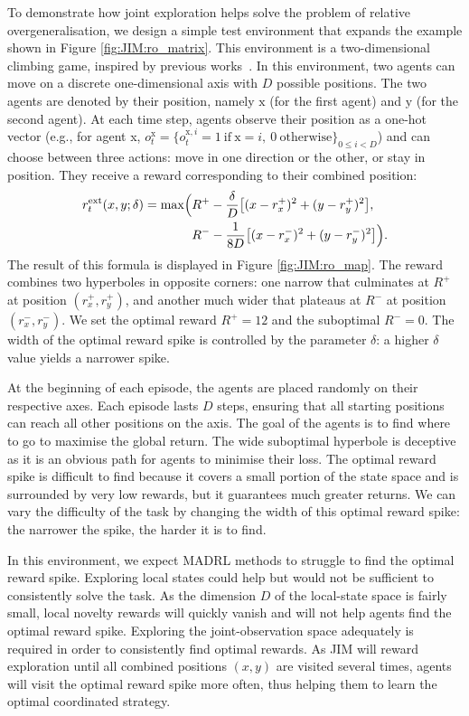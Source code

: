To demonstrate how joint exploration helps solve the problem of relative overgeneralisation, we design a simple test environment that expands the example shown in Figure \ref{fig:JIM:ro_matrix}. This environment is a two-dimensional climbing game, inspired by previous works~\citep{Wei2018_MultiSoftQ}. In this environment, two agents can move on a discrete one-dimensional axis with $D$ possible positions. The two agents are denoted by their position, namely $\mathrm{x}$ (for the first agent) and $\mathrm{y}$ (for the second agent). At each time step, agents observe their position as a one-hot vector (e.g., for agent x, $o^\mathrm{x}_t=\{o^{\mathrm{x},i}_t=1\ \text{if}\ \mathrm{x}=i,\ 0\ \text{otherwise}\}_{0\leq i<D}$) and can choose between three actions: move in one direction or the other, or stay in position. They receive a reward corresponding to their combined position:
\begin{align}\label{eq:JIM:Climbing}
    \begin{split}
        r^{\text{ext}}_t(x,y;\delta)=\mathrm{max}\Bigl(&R^+-\frac{\delta}{D}\bigl[(x-r^+_x)^2+(y-r^+_y)^2\bigr],\\
        &R^--\frac{1}{8D}\bigl[(x-r^-_x)^2+(y-r^-_y)^2\bigr]\Bigr).
    \end{split}
\end{align}
The result of this formula is displayed in Figure \ref{fig:JIM:ro_map}. The reward combines two hyperboles in opposite corners: one narrow that culminates at $R^+$ at position $(r^+_x,r^+_y)$, and another much wider that plateaus at $R^-$ at position $(r^-_x,r^-_y)$. We set the optimal reward $R^+=12$ and the suboptimal $R^-=0$. The width of the optimal reward spike is controlled by the parameter $\delta$: a higher $\delta$ value yields a narrower spike. 

At the beginning of each episode, the agents are placed randomly on their respective axes. Each episode lasts $D$ steps, ensuring that all starting positions can reach all other positions on the axis. The goal of the agents is to find where to go to maximise the global return. The wide suboptimal hyperbole is deceptive as it is an obvious path for agents to minimise their loss. The optimal reward spike is difficult to find because it covers a small portion of the state space and is surrounded by very low rewards, but it guarantees much greater returns. We can vary the difficulty of the task by changing the width of this optimal reward spike: the narrower the spike, the harder it is to find. 

In this environment, we expect MADRL methods to struggle to find the optimal reward spike. Exploring local states could help but would not be sufficient to consistently solve the task. As the dimension $D$ of the local-state space is fairly small, local novelty rewards will quickly vanish and will not help agents find the optimal reward spike. Exploring the joint-observation space adequately is required in order to consistently find optimal rewards. As JIM will reward exploration until all combined positions $(x,y)$ are visited several times, agents will visit the optimal reward spike more often, thus helping them to learn the optimal coordinated strategy. 

